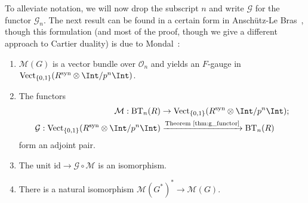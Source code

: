 \documentclass[10pt]{amsart}
\begin{document}
To alleviate notation, we will now drop the subscript $n$ and write $\mathcal{G}$ for the functor $\mathcal{G}_n$. The next result can be found in a certain form in Ansch\"utz-Le Bras~\cite{MR4530092}, though this formulation (and most of the proof, though we give a different approach to Cartier duality) is due to Mondal~\cite{Mondal2024-cy}:
\begin{proposition}
\label{prop:alb_mondal}
\begin{enumerate}
   \item $\mathcal{M}(G)$ is a vector bundle over $\mathcal{O}_n$ and yields an $F$-gauge in $\mathrm{Vect}_{\{0,1\}}(R^{\mathrm{syn}}\otimes\Int/p^n\Int)$.
   \item The functors 
\begin{align*}
   \mathcal{M}:\mathrm{BT}_n(R)&\to \mathrm{Vect}_{\{0,1\}}(R^{\mathrm{syn}}\otimes\Int/p^n\Int) ;\\
  \mathcal{G}: \mathrm{Vect}_{\{0,1\}}(R^{\mathrm{syn}}\otimes\Int/p^n\Int)&\xrightarrow{\text{Theorem~\ref{thm:g_functor}}} \mathrm{BT}_n(R)
\end{align*}
    form an adjoint pair.
    \item The unit $\mathrm{id}\to \mathcal{G}\circ\mathcal{M}$ is an isomorphism.
    \item There is a natural isomorphism $\mathcal{M}(G^*)^*\to \mathcal{M}(G)$.
\end{enumerate}
\end{proposition}
\end{document}
